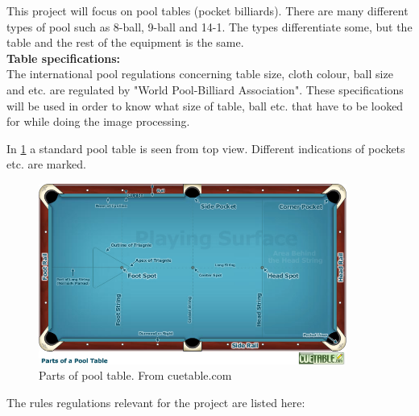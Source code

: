 This project will focus on pool tables (pocket billiards). There are many different types of pool such as 8-ball, 9-ball and 14-1. The types differentiate some, but the table and the rest of the equipment is the same.\\

\textbf{Table specifications:}\\
The international pool regulations concerning table size, cloth colour, ball size and etc. are regulated by "World Pool-Billiard Association"\cite{poolregulations}. These specifications will be used in order to know what size of table, ball etc. that have to be looked for while doing the image processing.

In \ref{fig:partspool} a standard pool table is seen from top view. Different indications of pockets etc. are marked.

\begin{figure}[H]
\begin{center}
\leavevmode
\includegraphics[width=0.9\textwidth]{images/pooltablespecs.jpg}
\end{center}
\caption{Parts of pool table. From cuetable.com}
\label{fig:partspool}
\end{figure}

The rules regulations relevant for the project are listed here:

